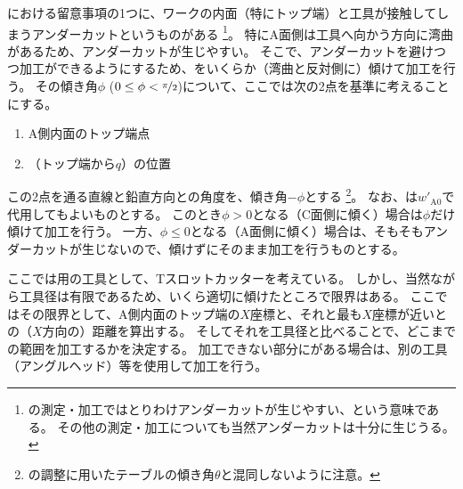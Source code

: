 \clearpage
\DimpleMilling における留意事項の1つに、ワークの内面（特にトップ端）と工具が接触してしまうアンダーカットというものがある
\footnote{\Dimple の測定・加工ではとりわけアンダーカットが生じやすい、という意味である。
その他の測定・加工についても当然アンダーカットは十分に生じうる。}。
特にA面側は工具へ向かう方向に湾曲があるため、アンダーカットが生じやすい。
そこで、アンダーカットを避けつつ加工ができるようにするため、をいくらか（湾曲と反対側に）傾けて加工を行う。
その傾き角$\phi$ ($0 \leq \phi < \nicefrac\pi2$)について、ここでは次の2点を基準に考えることにする。
\begin{tcolorbox}[title=A面の\Dimple, fonttitle=\gtfamily\bfseries]
\begin{enumerate}[label=\sarrow]
\item A側内面のトップ端点
\item \AFaceDimpleFirstRow（トップ端から$q$）の位置
\end{enumerate}
\end{tcolorbox}\noindent
この2点を通る直線と鉛直方向との角度を、傾き角$-\phi$とする
\footnote{\AlocationLength の調整に用いたテーブルの傾き角$\theta$と混同しないように注意。}。
なお、\TopEndACID は$w'_{\mathrm A0}$で代用してもよいものとする。
このとき$\phi > 0$となる（C面側に傾く）場合は$\phi$だけ傾けて加工を行う。
一方、$\phi \leq 0$となる（A面側に傾く）場合は、そもそもアンダーカットが生じないので、傾けずにそのまま加工を行うものとする。
\begin{hosoku}
ここでは\DimpleMilling 用の工具として、Tスロットカッターを考えている。
しかし、当然ながら工具径は有限であるため、いくら適切に傾けたところで限界はある。
ここではその限界として、A側内面のトップ端の$X$座標と、それと最も$X$座標が近い\Dimple との（$X$方向の）距離を算出する。
そしてそれを工具径と比べることで、どこまでの範囲を加工するかを決定する。
加工できない部分に\Dimple がある場合は、別の工具（アングルヘッド）等を使用して加工を行う。
\end{hosoku}
